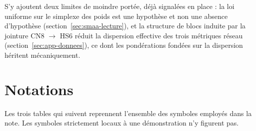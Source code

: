 \documentclass[11pt,a4paper]{article}
\theoremstyle{definition}
\theoremstyle{remark}
\begin{document}
\bigskip

S'y ajoutent deux limites de moindre portée, déjà signalées en place : la loi uniforme sur
le simplexe des poids est une hypothèse et non une absence d'hypothèse
(section~\ref{sec:smaa-lecture}), et la structure de blocs induite par la jointure
CN8 $\to$ HS6 réduit la dispersion effective des trois métriques réseau
(section~\ref{sec:app-donnees}), ce dont les pondérations fondées sur la dispersion
héritent mécaniquement.

\appendix

\section{Notations}
\label{app:notations}

\medskip

Les trois tables qui suivent reprennent l'ensemble des symboles employés dans la note. Les
symboles strictement locaux à une démonstration n'y figurent pas.

\medskip
\end{document}
